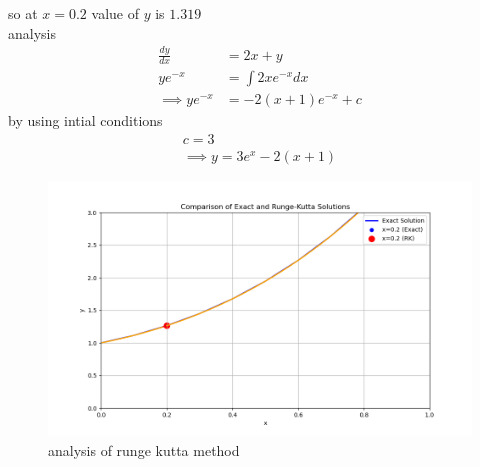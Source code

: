 \documentclass[journal,12pt,twocolumn]{IEEEtran}
\theoremstyle{remark}
\begin{document}
so at $x=0.2$ value of $y$ is $1.319$\\
analysis
\begin{align}
\frac{dy}{dx}&=2x+y\\
ye^{-x}&=\int2xe^{-x}dx\\
\implies ye^{-x}&=-2(x+1)e^{-x}+c
\end{align}
by using intial conditions
\begin{align}
c=3\\
\implies y=3e^x-2(x+1)
\end{align}
\begin{figure}[h!]
    \centering
    \includegraphics[width=1.1\linewidth]{figs/analysis.png}
    \caption{analysis of runge kutta method}
    \label{ag50.1}
\end{figure}
\end{document}
